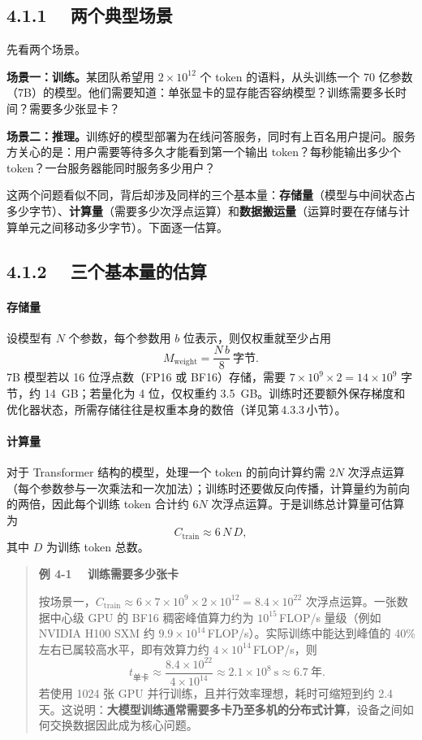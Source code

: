 \documentclass{article}
\begin{document}
\subsection*{4.1.1　 两个典型场景}

先看两个场景。

\textbf{场景一：训练。}某团队希望用 $2\times10^{12}$ 个 token 的语料，从头训练一个 70 亿参数（7B）的模型。他们需要知道：单张显卡的显存能否容纳模型？训练需要多长时间？需要多少张显卡？

\textbf{场景二：推理。}训练好的模型部署为在线问答服务，同时有上百名用户提问。服务方关心的是：用户需要等待多久才能看到第一个输出 token？每秒能输出多少个 token？一台服务器能同时服务多少用户？

这两个问题看似不同，背后却涉及同样的三个基本量：\textbf{存储量}（模型与中间状态占多少字节）、\textbf{计算量}（需要多少次浮点运算）和\textbf{数据搬运量}（运算时要在存储与计算单元之间移动多少字节）。下面逐一估算。

\subsection*{4.1.2　 三个基本量的估算}


\paragraph{存储量} 设模型有 $N$ 个参数，每个参数用 $b$ 位表示，则仅权重就至少占用
\[
M_{\mathrm{weight}} = \frac{N\,b}{8}\ \text{字节}. \tag{4-1}
\]
7B 模型若以 16 位浮点数（FP16 或 BF16）存储，需要 $7\times10^{9}\times 2 = 14\times10^{9}$ 字节，约 \SI{14}{GB}；若量化为 4 位，仅权重约 \SI{3.5}{GB}。训练时还要额外保存梯度和优化器状态，所需存储往往是权重本身的数倍（详见第\,4.3.3\,小节）。

\paragraph{计算量} 对于 Transformer 结构的模型，处理一个 token 的前向计算约需 $2N$ 次浮点运算（每个参数参与一次乘法和一次加法）；训练时还要做反向传播，计算量约为前向的两倍，因此每个训练 token 合计约 $6N$ 次浮点运算\cite{kaplan2020scaling}。于是训练总计算量可估算为
\[
C_{\mathrm{train}} \approx 6\,N\,D, \tag{4-2}
\]
其中 $D$ 为训练 token 总数。

\begin{quote}
\textbf{例 4-1　 训练需要多少张卡}


按场景一，$C_{\mathrm{train}}\approx 6\times7\times10^{9}\times2\times10^{12}=8.4\times10^{22}$ 次浮点运算。一张数据中心级 GPU 的 BF16 稠密峰值算力约为 $10^{15}$\,FLOP/s 量级（例如 NVIDIA H100 SXM 约 $9.9\times10^{14}$\,FLOP/s\cite{nvidia2023h100}）。实际训练中能达到峰值的 40\% 左右已属较高水平，即有效算力约 $4\times10^{14}$\,FLOP/s，则
\[
  t_{\text{单卡}} \approx \frac{8.4\times10^{22}}{4\times10^{14}} \approx 2.1\times10^{8}\ \text{s} \approx 6.7\ \text{年}.
\]
若使用 1024 张 GPU 并行训练，且并行效率理想，耗时可缩短到约 2.4 天。这说明：\textbf{大模型训练通常需要多卡乃至多机的分布式计算}，设备之间如何交换数据因此成为核心问题。
\end{quote}
\end{document}
